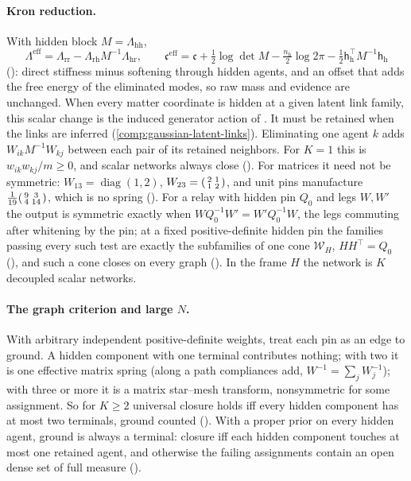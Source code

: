 \paragraph{Kron reduction.} With hidden block \(M=\Lambda_{\mathrm{hh}}\),
\[
\Lambda^{\mathrm{eff}}=\Lambda_{\mathrm{rr}}-\Lambda_{\mathrm{rh}}M^{-1}\Lambda_{\mathrm{hr}},\qquad
\mathfrak c^{\mathrm{eff}}=\mathfrak c+\tfrac12\log\det M-\tfrac{n_{\mathrm h}}2\log2\pi
-\tfrac12\mathsf h_{\mathrm h}^\top M^{-1}\mathsf h_{\mathrm h}
\]
(): direct stiffness minus softening through hidden agents, and an offset that
adds the free energy of the eliminated modes, so raw mass and evidence are unchanged. When every
matter coordinate is hidden at a given latent link family, this scalar change is the induced
generator action of . It must be retained when the links are inferred
(\cref{comp:gaussian-latent-links}). Eliminating one agent \(k\) adds
\(W_{ik}M^{-1}W_{kj}\) between each pair of its retained neighbors. For \(K=1\) this is \(w_{ik}w_{kj}/m\geq0\), and scalar
networks always close (). For matrices it need not be symmetric:
\(W_{13}=\operatorname{diag}(1,2)\), \(W_{23}=\begin{psmallmatrix}2&1\\1&2\end{psmallmatrix}\), and unit pins
manufacture \(\tfrac1{19}\begin{psmallmatrix}9&3\\4&14\end{psmallmatrix}\), which is no spring
(). For a relay with hidden pin \(Q_0\) and legs \(W,W'\) the output is symmetric exactly
when \(WQ_0^{-1}W'=W'Q_0^{-1}W\), the legs commuting after whitening by the pin; at a fixed positive-definite hidden
pin the families passing every such test are exactly the subfamilies of one cone \(\mathcal W_H\), \(HH^\top=Q_0\)
(), and such a cone closes on every graph
(). In the frame \(H\) the network is \(K\) decoupled scalar networks.

\paragraph{The graph criterion and large \(N\).} With arbitrary independent positive-definite weights, treat each pin
as an edge to ground. A hidden component with one terminal contributes nothing; with two it is one effective matrix
spring (along a path compliances add, \(W^{-1}=\sum_jW_j^{-1}\)); with three or more it is a matrix star--mesh
transform, nonsymmetric for some assignment. So for \(K\geq2\) universal closure holds iff every hidden component
has at most two terminals, ground counted (). With a proper prior on every
hidden agent, ground is always a terminal: closure iff each hidden component touches at most one retained agent,
and otherwise the failing assignments contain an open dense set of full measure ().

